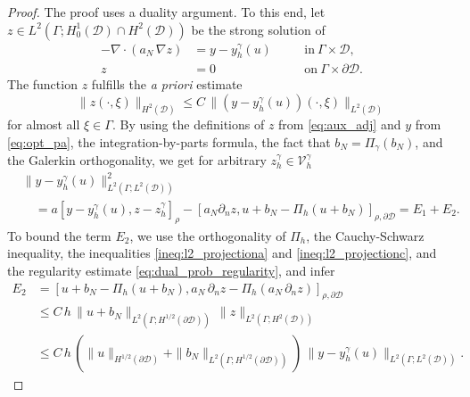 \documentclass[a4paper,10pt]{article}
\newcommand{\cD}{{\mathcal{D}}}
\newcommand{\yL}{{L^2(\Gamma;L^2(\cD))}}
\numberwithin{theorem}{section}
\begin{document}
\begin{proof}
The proof uses a duality argument. To this end, let $z\in L^2(\Gamma;H_0^1(\cD) \cap H^2(\cD))$ be the strong solution of
\begin{equation}
\begin{aligned} \label{eq:aux_adj}
	-\nabla\cdot(a_N \,\nabla z) &= y-y_h^\gamma(u) &\quad&\text{in}\ \Gamma\times \cD,\\
	z &= 0 && \text{on}\ \Gamma\times \partial\cD.
\end{aligned}
\end{equation}
The function $z$ fulfills the \emph{a priori} estimate
\begin{equation}
\label{eq:dual_prob_regularity}
	\|z(\cdot,\xi)\|_{H^2(\cD)} \le C\,\|(y-y_h^\gamma(u))(\cdot,\xi)\|_{L^2(\cD)}
\end{equation}
for almost all $\xi\in \Gamma$.
By using the definitions of $z$ from \eqref{eq:aux_adj} and $y$ from \eqref{eq:opt_pa}, the integration-by-parts formula, the fact that $b_N = \Pi_\gamma(b_N)$, and  the Galerkin orthogonality, we get for arbitrary $z_h^\gamma\in \mathcal V_h^\gamma$ 
\begin{align}\label{eq:FE_error_h1_splitting}
  &\|  y - y_h^{\gamma}(u) \|_{\yL}^2  \nonumber \\
  &\quad =a[y-y_h^\gamma(u), z-z_h^\gamma]_{\rho} - [a_N\partial_n z, u+b_N - \Pi_h(u+b_N)]_{\rho,\partial\cD}
    = E_1 + E_2.
\end{align}
To bound the term $E_2$, we use the orthogonality of $\Pi_h$, the Cauchy-Schwarz inequality, the inequalities \eqref{ineq:l2_projectiona} and \eqref{ineq:l2_projectionc}, and the regularity estimate \eqref{eq:dual_prob_regularity}, and infer
\begin{align}
\label{pr9}
  E_2 &= [u+b_N - \Pi_h(u+b_N), a_N\,\partial_n z - \Pi_h(a_N\,\partial_n z)]_{\rho,\partial\cD}
        \nonumber \\
      &\le C\,h\,\|u+b_N\|_{L^2(\Gamma;H^{1/2}(\partial\cD))}\, \|z\|_{L^2(\Gamma; H^2(\cD))}
        \nonumber \\
      &\le
        C\,h\,(\|u\|_{H^{1/2}(\partial\cD)} + \|b_N\|_{L^2(\Gamma; H^{1/2}(\partial\cD))})\,\|y-y_h^\gamma(u)\|_{L^2(\Gamma; L^2(\cD))}.
\end{align}


\end{proof}
\end{document}
